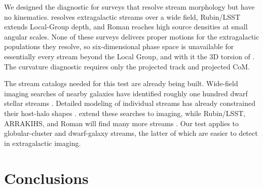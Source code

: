 \documentclass[linenumbers,twocolumn]{aastex701}
\newcommand{\rubinlsst}{\gls{Rubin}/\gls{LSST}}
\begin{document}
        We designed the diagnostic for surveys that resolve stream morphology but have no kinematics. %
        \euclid{} \citep{EuclidCollaboration+:2025:EuclidQuickData,Euclid+Walmsley+:2025:Q1} resolves extragalactic streams over a wide field, \rubinlsst{} \citep{Ivezic+:2019:LSSTScienceDrivers} extends Local-Group depth, and \gls{Roman} \citep{Spergel+:2015:WideFieldInfrarRedSurvey,Dey+:2023:RomAndromedaRoman} reaches high source densities at small angular scales. %
        None of these surveys delivers proper motions for the extragalactic populations they resolve, so six-dimensional phase space is unavailable for essentially every stream beyond the Local Group, and with it the 3D torsion of \citet{Bariego-Quintana:2024:TorsionStellarStreams}. %
        The curvature diagnostic requires only the projected track and projected \gls{CoM}. %

        The stream catalogs needed for this test are already being built. %
        Wide-field imaging searches of nearby galaxies have identified roughly one hundred dwarf stellar streams \citep{Martinez-Delgado+:2010:StellarTidalStreams,MartinezDelgado+:2023:HiddenDepthsLocal,Martinez-Delgado+:2025:StellarTidalStreams,Miro-Carretero+:2024:ExtragalacticStellarTidal,Miro-Carretero+:2025:ExtragalacticStellarTidal,Sola+:2025}. %
        Detailed modeling of individual streams has already constrained their host-halo shapes \citep{Pearson:2022:MappingDarkMatter,Walder+:2024:ProbingDarkMatter,Nibauer+Pearson:2026:TestingDarkMatter,Wu+:2026:PotamidesMappingDark,Chemaly+:2026:ConstraintsPopulationLevel}. %
        \citet{Starkman+:2026:EuclidQ1} extend these searches to \euclid{} imaging, while \rubinlsst{}, \gls{ARRAKIHS}, and \gls{Roman} will find many more streams \citep{Ivezic+:2019:LSSTScienceDrivers,Guzman+:2022:ARRAKIHS,Spergel+:2015:WideFieldInfrarRedSurvey}. %
        Our test applies to globular-cluster and dwarf-galaxy streams, the latter of which are easier to detect in extragalactic imaging. %



\section{Conclusions}\label{sec:conclusions}
\end{document}
